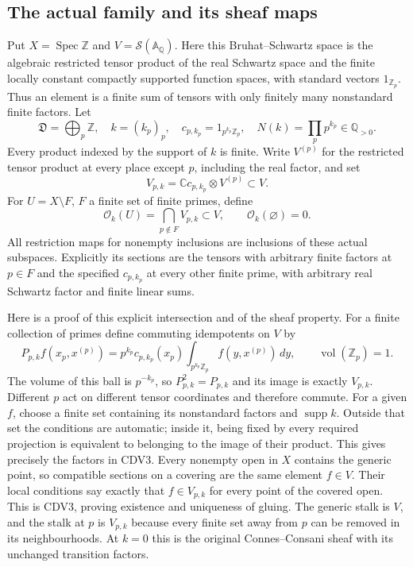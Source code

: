 \documentclass[11pt,a4paper]{article}
\theoremstyle{definition}\newtheorem{definition}[theorem]{Definition}
\begin{document}
\subsection{The actual family and its sheaf maps}

Put $X=\operatorname{Spec}\mathbb Z$ and
$V=\mathcal S(\mathbb A_{\mathbb Q})$. Here this Bruhat--Schwartz
space is the algebraic restricted tensor product of the real Schwartz
space and the finite locally constant compactly supported function
spaces, with standard vectors $1_{\mathbb Z_p}$. Thus an element is a
finite sum of tensors with only finitely many nonstandard finite
factors. Let
\begin{equation}\tag{CDV1}
 \mathfrak D=\bigoplus_p\mathbb Z,
 \quad k=(k_p)_p,\quad
 c_{p,k_p}=1_{p^{k_p}\mathbb Z_p},\quad
 N(k)=\prod_p p^{k_p}\in\mathbb Q_{>0}.
\end{equation}
Every product indexed by the support of $k$ is finite. Write
$V^{(p)}$ for the restricted tensor product at every place except $p$,
including the real factor, and set
\begin{equation}\tag{CDV2}
 V_{p,k}=\mathbb Cc_{p,k_p}\otimes V^{(p)}\subset V.
\end{equation}
For $U=X\setminus F$, $F$ a finite set of finite primes, define
\begin{equation}\tag{CDV3}
 \mathcal O_k(U)=\bigcap_{p\notin F}V_{p,k}\subset V,
 \qquad \mathcal O_k(\varnothing)=0.
\end{equation}
All restriction maps for nonempty inclusions are inclusions of these
actual subspaces. Explicitly its sections are the tensors with arbitrary
finite factors at $p\in F$ and the specified $c_{p,k_p}$ at every
other finite prime, with arbitrary real Schwartz factor and finite
linear sums.

Here is a proof of this explicit intersection and of the sheaf property.
For a finite collection of primes define commuting idempotents on $V$
by
\begin{equation}\tag{CDV4}
 P_{p,k}f(x_p,x^{(p)})
 =p^{k_p}c_{p,k_p}(x_p)
                  \int_{p^{k_p}\mathbb Z_p}f(y,x^{(p)})\,dy,
 \qquad \operatorname{vol}(\mathbb Z_p)=1.
\end{equation}
The volume of this ball is $p^{-k_p}$, so $P_{p,k}^2=P_{p,k}$
and its image is exactly $V_{p,k}$. Different $p$ act on different
tensor coordinates and therefore commute. For a given $f$, choose a
finite set containing its nonstandard factors and $\operatorname{supp}k$.
Outside that set the conditions are automatic; inside it, being fixed
by every required projection is equivalent to belonging to the image
of their product. This gives precisely the factors in CDV3.
Every nonempty open in $X$ contains the generic point, so compatible
sections on a covering are the same element $f\in V$. Their local
conditions say exactly that $f\in V_{p,k}$ for every point of the
covered open. This is CDV3, proving existence and uniqueness of gluing.
The generic stalk is $V$, and the stalk at $p$ is $V_{p,k}$ because
every finite set away from $p$ can be removed in its neighbourhoods.
At $k=0$ this is the original Connes--Consani sheaf with its unchanged
transition factors.
\end{document}
